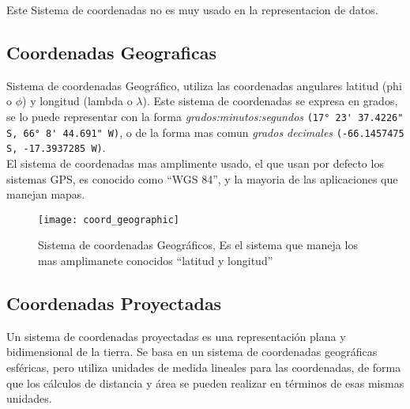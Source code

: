         Este Sistema de coordenadas no es muy usado en la representacion de datos.

      \subsection{Coordenadas Geograficas} %
      \label{sub:coordenadas_geograficas}
        Sistema de coordenadas Geográfico, utiliza las coordenadas angulares latitud  (phi o ${\phi}$) y longitud (lambda o ${\lambda}$). Este sistema de coordenadas se expresa en grados, se lo puede representar con la forma \emph{grados:minutos:segundos }\verb|(17° 23' 37.4226" S, 66° 8' 44.691" W)|, o de la forma mas comun \emph{grados decimales} \verb|(-66.1457475 S, -17.3937285 W)|.\\

        El sistema de coordenadas  mas amplimente usado, el que usan por defecto los sistemas GPS, es conocido como ``WGS 84'', y la mayoria de las aplicaciones que manejan mapas.\\

        \begin{figure}[!hbp]
          \begin{center}
            \texttt{[image: coord\_geographic]}
          \end{center}
          \caption[Sistema de coordenadas Geográficos]{Sistema de coordenadas Geográficos, Es el sistema que maneja los mas amplimanete conocidos ``latitud y longitud''} 
          \label{fig:coord_geographic}
        \end{figure}   


      \subsection{Coordenadas Proyectadas} %
      \label{sub:coordenadas_proyectadas}
        Un sistema de coordenadas proyectadas es una representación plana y bidimensional de la  tierra. Se basa en un sistema de coordenadas geográficas esf\'ericas, pero utiliza unidades de medida lineales para las coordenadas, de forma que los cálculos de distancia y área se pueden realizar en términos de esas mismas unidades.\cite{projected_ibm} \\

